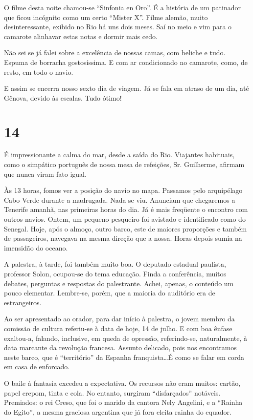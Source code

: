 O filme desta noite chamou-se ``Sinfonia en Oro''. É a história de um patinador que ficou incógnito como um certo ``Mister X''. Filme alemão, muito desinteressante, exibido no Rio há uns dois meses. Saí no meio e vim para o camarote alinhavar estas notas e dormir mais cedo.

Não sei se já falei sobre a excelência de nossas camas, com beliche e tudo. Espuma de borracha gostosíssima. E com ar condicionado no camarote, como, de resto, em todo o navio.

E assim se encerra nosso sexto dia de viagem. Já se fala em atraso de um dia, até Gênova, devido às escalas. Tudo ótimo!


\section*{14 \adfflatleafright {}}

É impressionante a calma do mar, desde a saída do Rio. Viajantes habituais, como o simpático português de nossa mesa de refeições, Sr. Guilherme, afirmam que nunca viram fato igual.

Às 13 horas, fomos ver a posição do navio no mapa. Passamos pelo arquipélago Cabo Verde durante a madrugada. Nada se viu. Anunciam que chegaremos a Tenerife amanhã, nas primeiras horas do dia. Já é mais freqüente o encontro com outros navios. Ontem, um pequeno pesqueiro foi avistado e identificado como do Senegal. Hoje, após o almoço, outro barco, este de maiores proporções e também de passageiros, navegava na mesma direção que a nossa. Horas depois sumia na imensidão do oceano.

A palestra, à tarde, foi também muito boa. O deputado estadual paulista, professor Solon, ocupou-se do tema educação. Finda a conferência, muitos debates, perguntas e respostas do palestrante. Achei, apenas, o conteúdo um pouco elementar. Lembre-se, porém, que a maioria do auditório era de estrangeiros.

Ao ser apresentado ao orador, para dar início à palestra, o jovem membro da comissão de cultura referiu-se à data de hoje, 14 de julho. E com boa ênfase exaltou-a, falando, inclusive, em queda de opressão, referindo-se, naturalmente, à data marcante da revolução francesa. Assunto delicado, pois nos encontramos neste barco, que é ``território'' da Espanha franquista\ldots É como se falar em corda em casa de enforcado.

O baile à fantasia excedeu a expectativa. Os recursos não eram muitos: cartão, papel crepom, tinta e cola. No entanto, surgiram ``disfarçados'' notáveis. Premiados: o rei Creso, que foi o marido da cantora Nely Angelini, e a ``Rainha do Egito'', a mesma graciosa argentina que já fora eleita rainha do equador.

